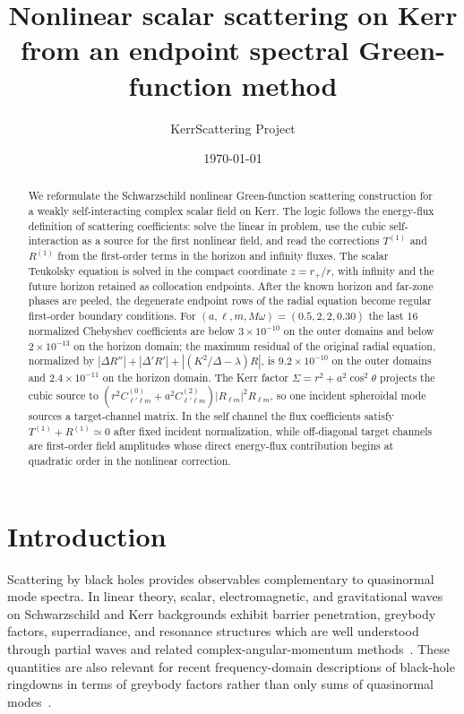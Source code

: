 \documentclass[aps,prd,twocolumn,nofootinbib,superscriptaddress,10pt,floatfix]{revtex4-2}
\newcommand{\rp}{r_+}
\begin{document}
\title{Nonlinear scalar scattering on Kerr from an endpoint spectral Green-function method}

\author{KerrScattering Project}

\date{\today}

\begin{abstract}
We reformulate the Schwarzschild nonlinear Green-function scattering
construction for a weakly self-interacting complex scalar field on Kerr.  The
logic follows the energy-flux definition of scattering coefficients: solve the
linear in problem, use the cubic self-interaction as a source for the first
nonlinear field, and read the corrections $T^{(1)}$ and $R^{(1)}$ from the
first-order terms in the horizon and infinity fluxes.  The scalar Teukolsky
equation is solved in the compact coordinate $z=\rp/r$, with infinity and the
future horizon retained as collocation endpoints.  After the known horizon and
far-zone phases are peeled, the degenerate endpoint rows of the radial equation
become regular first-order boundary conditions.  For
$(a,\ell,m,M\omega)=(0.5,2,2,0.30)$ the last 16 normalized Chebyshev
coefficients are below $3\times10^{-10}$ on the outer domains and below
$2\times10^{-13}$ on the horizon domain; the maximum residual of the original
radial equation, normalized by
$|\Delta R''|+|\Delta'R'|+|(K^2/\Delta-\lambda)R|$, is
$9.2\times10^{-10}$ on the outer domains and $2.4\times10^{-11}$ on the
horizon domain.  The Kerr factor $\Sigma=r^2+a^2\cos^2\theta$ projects the
cubic source to
$(r^2C^{(0)}_{\ell'\ell m}+a^2C^{(2)}_{\ell'\ell m})|R_{\ell m}|^2R_{\ell m}$,
so one incident spheroidal mode sources a target-channel matrix.  In the self
channel the flux coefficients satisfy $T^{(1)}+R^{(1)}\simeq0$ after fixed
incident normalization, while off-diagonal target channels are first-order field
amplitudes whose direct energy-flux contribution begins at quadratic order in
the nonlinear correction.
\end{abstract}

\maketitle

\section{Introduction}

Scattering by black holes provides observables complementary to quasinormal
mode spectra.  In linear theory, scalar, electromagnetic, and gravitational
waves on Schwarzschild and Kerr backgrounds exhibit barrier penetration,
greybody factors, superradiance, and resonance structures which are well
understood through partial waves and related complex-angular-momentum
methods~\cite{Taylor,Futterman,Teukolsky1973,StarobinskyChurilov,PressTeukolsky,GlampedakisAndersson,Dolan2008}.
These quantities are also relevant for recent frequency-domain descriptions of
black-hole ringdowns in terms of greybody factors rather than only sums of
quasinormal modes~\cite{Oshita2022,Rosato2024}.
\end{document}
